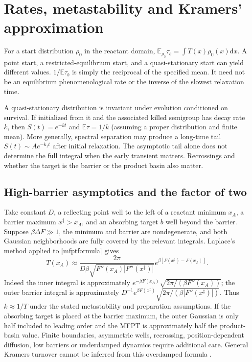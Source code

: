\documentclass[11pt,a4paper]{article}
\newcommand{\dd}{\mathrm d}
\newcommand{\E}{\mathbb E}
\theoremstyle{remark}\newtheorem*{remark}{Physical interpretation}
\begin{document}
\section{Rates, metastability and Kramers' approximation}
For a start distribution $\rho_0$ in the reactant domain, $\E_{\rho_0}\tau_b=\int T(x)\rho_0(x)\dd x$. A point start, a restricted-equilibrium start, and a quasi-stationary start can yield different values. $1/\E\tau_b$ is simply the reciprocal of the specified mean. It need not be an equilibrium phenomenological rate or the inverse of the slowest relaxation time.

A quasi-stationary distribution is invariant under evolution conditioned on survival. If initialized from it and the associated killed semigroup has decay rate $k$, then $S(t)=e^{-kt}$ and $\E\tau=1/k$ (assuming a proper distribution and finite mean). More generally, spectral separation may produce a long-time tail $S(t)\sim A e^{-k_1t}$ after initial relaxation. The asymptotic tail alone does not determine the full integral when the early transient matters. Recrossings and whether the target is the barrier or the product basin also matter.

\subsection{High-barrier asymptotics and the factor of two}
Take constant $D$, a reflecting point well to the left of a reactant minimum $x_A$, a barrier maximum $x^\ddagger>x_A$, and an absorbing target $b$ well beyond the barrier. Suppose $\beta\Delta F\gg1$, the minimum and barrier are nondegenerate, and both Gaussian neighborhoods are fully covered by the relevant integrals. Laplace's method applied to \eqref{mfptformula} gives
\begin{equation}T(x_A)\approx\frac{2\pi}{D\beta\sqrt{F''(x_A)|F''(x^\ddagger)|}}e^{\beta[F(x^\ddagger)-F(x_A)]}.
\end{equation}
Indeed the inner integral is approximately $e^{-\beta F(x_A)}\sqrt{2\pi/(\beta F''(x_A))}$; the outer barrier integral is approximately $D^{-1}e^{\beta F(x^\ddagger)}\sqrt{2\pi/(\beta|F''(x^\ddagger)|)}$. Thus $k\approx1/T$ under the stated metastability and preparation assumptions. If the absorbing target is placed \emph{at} the barrier maximum, the outer Gaussian is only half included to leading order and the MFPT is approximately half the product-basin value. Finite boundaries, asymmetric wells, recrossing, position-dependent diffusion, low barriers or underdamped dynamics require additional care. General Kramers turnover cannot be inferred from this overdamped formula \cite{hanggi}.
\end{document}
